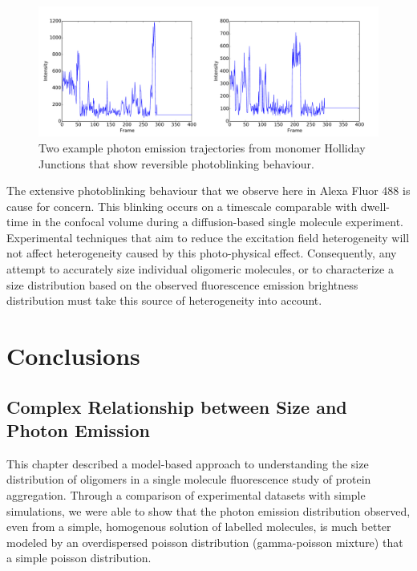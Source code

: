 \begin{figure}
   \begin{center}
      \includegraphics*[width=5in]{sizing/blinking_trajectories.pdf}
      \caption{Two example photon emission trajectories from monomer Holliday Junctions that show reversible photoblinking behaviour.}
      \label{fig:blinking}
   \end{center}
\end{figure}

The extensive photoblinking behaviour that we observe here in Alexa Fluor 488 is cause for concern. This blinking occurs on a timescale comparable with dwell-time in the confocal volume during a diffusion-based single molecule experiment. Experimental techniques that aim to reduce the excitation field heterogeneity will not affect heterogeneity caused by this photo-physical effect. Consequently, any attempt to accurately size individual oligomeric molecules, or to characterize a size distribution based on the observed fluorescence emission brightness distribution must take this source of heterogeneity into account.      

\section{Conclusions}
\subsection{Complex Relationship between Size and Photon Emission}
This chapter described a model-based approach to understanding the size distribution of oligomers in a single molecule fluorescence study of protein aggregation. Through a comparison of experimental datasets with simple simulations, we were able to show that the photon emission distribution observed, even from a simple, homogenous solution of labelled molecules, is much better modeled by an overdispersed poisson distribution (gamma-poisson mixture) that a simple poisson distribution.

